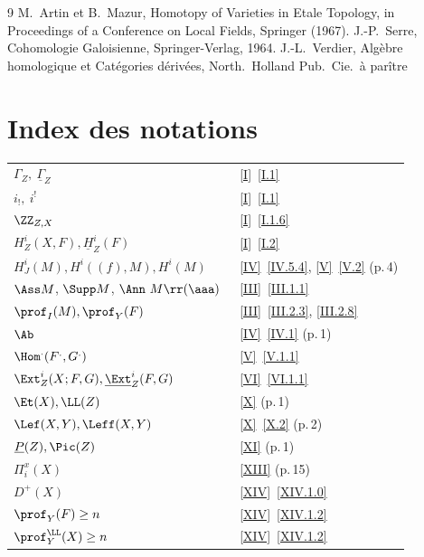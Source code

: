 \begin{thebibliography}{9}
%
M.\, Artin et B.\, Mazur, Homotopy of Varieties in Etale Topology, in Proceedings of a Conference on Local Fields, Springer (1967).
%
J.-P.\, Serre, Cohomologie Galoisienne, Springer-Verlag, 1964.
%
J.-L.\, Verdier, Alg\`ebre homologique et Cat\'egories d\'eriv\'ees, North.\ Holland Pub.\ Cie.\, \`a par\^itre
\end{thebibliography}

\chapter*{Index des notations}

\begin{tabular}{p{9cm}p{3cm}}
$\Gamma_{Z}, \ \underline{\Gamma}_{Z}$\ \dotfill & \ref{I}~\ref{I.1}\\
$i_{!}, \ i^{!}$\ \dotfill & \ref{I}~\ref{I.1}\\
$\ZZ_{Z, X}$\ \dotfill & \ref{I}~\ref{I.1.6}\\
$H^{i}_{Z}(X, F), \underline{H}^{i}_{Z}(F)$\ \dotfill & \ref{I}~\ref{I.2}\\
$H^{i}_{J}(M), H^{i}((f), M), H^{i}(M)$\ \dotfill & \ref{IV}~\ref{IV.5.4}, \ref{V}~\ref{V.2} (p.\,4)\\
$\Ass M$, $\Supp M$, $\Ann \ M \rr(\aaa)$\ \dotfill & \ref{III}~\ref{III.1.1}\\
$\prof_{I}(M), \prof_{Y}(F)$\ \dotfill & \ref{III}~\ref{III.2.3}, \ref{III.2.8}\\
$\Ab$\ \dotfill & \ref{IV}~\ref{IV.1} (p.\,1)\\
$\Hom^{.}(F^{.}, G^{.})$\ \dotfill & \ref{V}~\ref{V.1.1}\\
$\Ext^{i}_{Z}(X;F, G), \underline{\Ext}^{i}_{Z}(F, G)$\ \dotfill & \ref{VI}~\ref{VI.1.1}\\
${\Et}(X), \LL(Z)$\ \dotfill & \ref{X} (p.\,1)\\
$\Lef(X, Y), \Leff(X, Y)$\ \dotfill & \ref{X}~\ref{X.2} (p.\,2)\\
$\underline{P}(Z), \Pic(Z)$\ \dotfill & \ref{XI} (p.\,1)\\
$\Pi_{i}^{x}(X)$\ \dotfill & \ref{XIII} (p.\,15)\\
$D^{+}(X)$\ \dotfill & \ref{XIV}~\ref{XIV.1.0}\\
$\prof_{Y}(F) \geq n$\ \dotfill & \ref{XIV}~\ref{XIV.1.2}\\
$\prof_{Y}^{\LL}(X) \geq n$\ \dotfill & \ref{XIV}~\ref{XIV.1.2}\\

\end{tabular}
